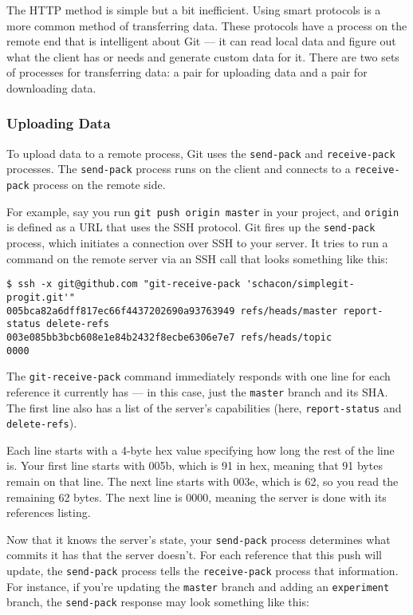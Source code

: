 \documentclass[a4paper]{book}
\begin{document}
The HTTP method is simple but a bit inefficient. Using smart protocols is a more common method of transferring data. These protocols have a process on the remote end that is intelligent about Git --- it can read local data and figure out what the client has or needs and generate custom data for it. There are two sets of processes for transferring data: a pair for uploading data and a pair for downloading data.

\subsubsection{Uploading Data}

To upload data to a remote process, Git uses the \texttt{send-pack} and \texttt{receive-pack} processes. The \texttt{send-pack} process runs on the client and connects to a \texttt{receive-pack} process on the remote side.

For example, say you run \texttt{git push origin master} in your project, and \texttt{origin} is defined as a URL that uses the SSH protocol. Git fires up the \texttt{send-pack} process, which initiates a connection over SSH to your server. It tries to run a command on the remote server via an SSH call that looks something like this:

\begin{shaded}\begin{verbatim}
$ ssh -x git@github.com "git-receive-pack 'schacon/simplegit-progit.git'"
005bca82a6dff817ec66f4437202690a93763949 refs/heads/master report-status delete-refs
003e085bb3bcb608e1e84b2432f8ecbe6306e7e7 refs/heads/topic
0000
\end{verbatim}\end{shaded}

The \texttt{git-receive-pack} command immediately responds with one line for each reference it currently has --- in this case, just the \texttt{master} branch and its SHA. The first line also has a list of the server's capabilities (here, \texttt{report-status} and \texttt{delete-refs}).

Each line starts with a 4-byte hex value specifying how long the rest of the line is. Your first line starts with 005b, which is 91 in hex, meaning that 91 bytes remain on that line. The next line starts with 003e, which is 62, so you read the remaining 62 bytes. The next line is 0000, meaning the server is done with its references listing.

Now that it knows the server's state, your \texttt{send-pack} process determines what commits it has that the server doesn't. For each reference that this push will update, the \texttt{send-pack} process tells the \texttt{receive-pack} process that information. For instance, if you're updating the \texttt{master} branch and adding an \texttt{experiment} branch, the \texttt{send-pack} response may look something like this:
\end{document}
